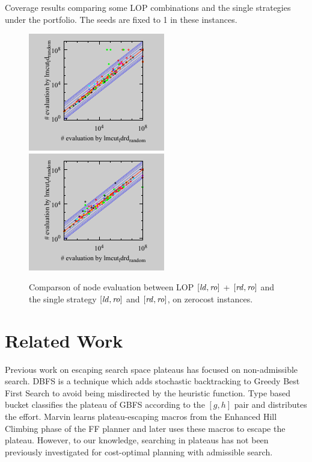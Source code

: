 \begin{table}[tb]
 \centering {}
 
 \caption{Coverage results comparing some LOP combinations and the
 single strategies under the portfolio. The seeds are fixed to 1 in these instances.}
 \label{portfolio-coverage}
\end{table}


\begin{figure}[tb]
 \centering
 \includegraphics{tables/aaai16-multi-ldrd/zerocost/evaluated-nokey-lmcut_ldrd_random-lmcut_ld_random.pdf}
 \includegraphics{tables/aaai16-multi-ldrd/zerocost/evaluated-nokey-lmcut_ldrd_random-lmcut_rd_random.pdf}
 \caption{Comparson of node evaluation between LOP $[\mbox{\textit{ld}},\mbox{\textit{ro}}]$ +
 $[\mbox{\textit{rd}},\mbox{\textit{ro}}]$ and the single strategy $[\mbox{\textit{ld}},\mbox{\textit{ro}}]$ and $[\mbox{\textit{rd}},\mbox{\textit{ro}}]$, on
 zerocost instances.}  \label{portfolio-runtime}
\end{figure}


\section{Related Work}
\label{sec-4}

Previous work on escaping search space plateaus has focused on
non-admissible search.  DBFS \cite{imai2011novel} is a technique which
adds stochastic backtracking to Greedy Best First Search to avoid
being misdirected by the heuristic function. Type based bucket
\cite{xie14type} classifies the plateau of GBFS according to the
$[g,h]$ pair and distributes the effort.  Marvin \cite{Coles07} learns plateau-escaping macros
from the Enhanced Hill Climbing phase of the FF planner
\cite{Hoffmann01} and later uses these macros to escape the plateau.
However, to our knowledge, searching in plateaus has not been
previously investigated for cost-optimal planning with admissible
search.

